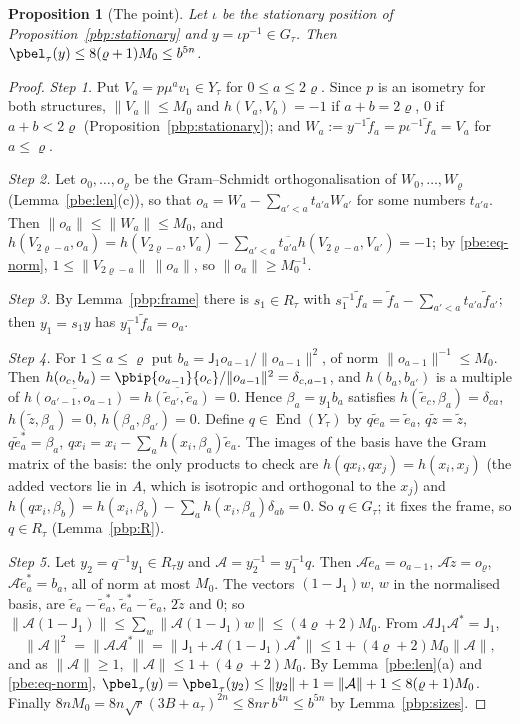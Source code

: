 \documentclass[10pt]{amsart}
\newtheorem{proposition}[theorem]{Proposition}
\theoremstyle{definition}
\theoremstyle{remark}
\providecommand{\aubar}[1]{\overline{#1}}
\begin{document}
\begin{proposition}[The point]\label{pbp:point}
Let $\iota$ be the stationary position of Proposition~\ref{pbp:stationary} and $y=\iota p^{-1}\in
G_\tau$. Then $\pbel_\tau(y)\le8(\varrho+1)M_0\le b^{5n}$.
\end{proposition}
\begin{proof}
\emph{Step 1.} Put $V_a=p\mu^av_1\in Y_\tau$ for $0\le a\le2\varrho$. Since $p$ is an isometry for both
structures, $\|V_a\|\le M_0$ and $h(V_a,V_b)=-1$ if $a+b=2\varrho$, $0$ if $a+b<2\varrho$
(Proposition~\ref{pbp:stationary}); and $W_a:=y^{-1}\tilde f_a=p\iota^{-1}\tilde f_a=V_a$ for
$a\le\varrho$.

\emph{Step 2.} Let $o_0,\dots,o_\varrho$ be the Gram--Schmidt orthogonalisation of $W_0,\dots,W_\varrho$
(Lemma~\ref{pbe:len}(c)), so that $o_a=W_a-\sum_{a'<a}t_{a'a}W_{a'}$ for some numbers $t_{a'a}$. Then
$\|o_a\|\le\|W_a\|\le M_0$, and $h(V_{2\varrho-a},o_a)=h(V_{2\varrho-a},V_a)-\sum_{a'<a}\aubar{t_{a'a}}
h(V_{2\varrho-a},V_{a'})=-1$; by \eqref{pbe:eq-norm}, $1\le\|V_{2\varrho-a}\|\,\|o_a\|$, so
$\|o_a\|\ge M_0^{-1}$.

\emph{Step 3.} By Lemma~\ref{pbp:frame} there is $s_1\in R_\tau$ with $s_1^{-1}\tilde f_a=\tilde f_a-
\sum_{a'<a}t_{a'a}\tilde f_{a'}$; then $y_1=s_1y$ has $y_1^{-1}\tilde f_a=o_a$.

\emph{Step 4.} For $1\le a\le\varrho$ put $b_a=\mathsf J_1o_{a-1}/\|o_{a-1}\|^2$, of norm $\|o_{a-1}\|^{-1}
\le M_0$. Then $h(o_c,b_a)=\pbip{o_{a-1}}{o_c}/\|o_{a-1}\|^2=\delta_{c,a-1}$, and $h(b_a,b_{a'})$ is a
multiple of $\aubar{h(o_{a'-1},o_{a-1})}=\aubar{h(\tilde e_{a'},\tilde e_a)}=0$. Hence $\beta_a=y_1b_a$
satisfies $h(\tilde e_c,\beta_a)=\delta_{ca}$, $h(\tilde z,\beta_a)=0$, $h(\beta_a,\beta_{a'})=0$. Define
$q\in\operatorname{End}(Y_\tau)$ by $q\tilde e_a=\tilde e_a$, $q\tilde z=\tilde z$, $q\tilde e_a^*=\beta_a$,
$qx_i=x_i-\sum_ah(x_i,\beta_a)\tilde e_a$. The images of the basis have the Gram matrix of the basis:
the only products to check are $h(qx_i,qx_j)=h(x_i,x_j)$ (the added vectors lie in $A$, which is
isotropic and orthogonal to the $x_j$) and $h(qx_i,\beta_b)=h(x_i,\beta_b)-\sum_ah(x_i,\beta_a)
\delta_{ab}=0$. So $q\in G_\tau$; it fixes the frame, so $q\in R_\tau$ (Lemma~\ref{pbp:R}).

\emph{Step 5.} Let $y_2=q^{-1}y_1\in R_\tau y$ and $\mathcal A=y_2^{-1}=y_1^{-1}q$. Then $\mathcal A\tilde
e_a=o_{a-1}$, $\mathcal A\tilde z=o_\varrho$, $\mathcal A\tilde e_a^*=b_a$, all of norm at most $M_0$. The
vectors $(1-\mathsf J_1)w$, $w$ in the normalised basis, are $\tilde e_a-\tilde e_a^*$, $\tilde e_a^*-
\tilde e_a$, $2\tilde z$ and $0$; so $\|\mathcal A(1-\mathsf J_1)\|\le\sum_w\|\mathcal A(1-\mathsf J_1)w\|
\le(4\varrho+2)M_0$. From $\mathcal A\mathsf J_1\mathcal A^*=\mathsf J_1$,
\[
\|\mathcal A\|^2=\|\mathcal A\mathcal A^*\|=\|\mathsf J_1+\mathcal A(1-\mathsf J_1)\mathcal A^*\|\le
1+(4\varrho+2)M_0\|\mathcal A\|,
\]
and as $\|\mathcal A\|\ge1$, $\|\mathcal A\|\le1+(4\varrho+2)M_0$. By Lemma~\ref{pbe:len}(a) and
\eqref{pbe:eq-norm}, $\pbel_\tau(y)=\pbel_\tau(y_2)\le\|y_2\|+1=\|\mathcal A\|+1\le8(\varrho+1)M_0$.
Finally $8nM_0=8n\sqrt r(3B+a_\tau)^{2n}\le8nr\,b^{4n}\le b^{5n}$ by Lemma~\ref{pbp:sizes}.
\end{proof}
\end{document}

